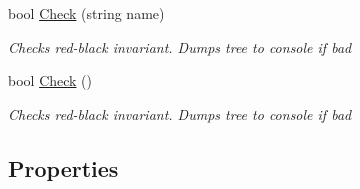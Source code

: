 \begin{DoxyCompactItemize}
bool \hyperlink{class_c5_1_1_tree_set_aa62f808741d28b8e89f031286630d2bb}{Check} (string name)
\begin{DoxyCompactList}\small\item\em Checks red-\/black invariant. Dumps tree to console if bad \end{DoxyCompactList}\item 
bool \hyperlink{class_c5_1_1_tree_set_a61ffe2a7d9b67271825748d2cefb1274}{Check} ()
\begin{DoxyCompactList}\small\item\em Checks red-\/black invariant. Dumps tree to console if bad \end{DoxyCompactList}\end{DoxyCompactItemize}
\subsection*{Properties}
